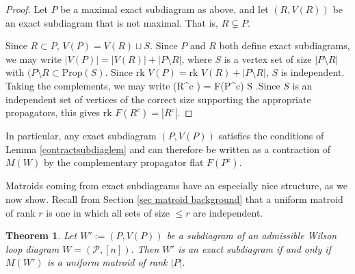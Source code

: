\documentclass[11pt]{article}
\newcommand{\rk}{\textrm{rk }}
\def\bas #1\eas{\begin{align*} #1 \end{align*}}
\newcommand{\cP}{\mathcal{P}}
\newcommand{\Prop}{\textrm{Prop}}
\newtheorem{thm}{Theorem}[section]
\theoremstyle{remark}
\theoremstyle{definition}
\begin{document}
\begin{proof}
Let $P$ be a maximal exact subdiagram as above, and let $(R,V(R))$ be an exact subdiagram that is not maximal. That is, $R \subsetneq P$.

Since $R \subset P$, $V(P) = V(R) \sqcup S$. Since $P$ and $R$ both define exact subdiagrams, we may write $|V(P)| = |V(R)| + |P \setminus R|$, where $S$ is a vertex set of size $|P \setminus R|$ with $(P \setminus R \subset \Prop(S)$. Since $\rk V(P) =  \rk V(R) + |P \setminus R|$, $S$ is independent. Taking the complements, we may write \bas F(R^c ) = F(P^c) \sqcup S \;.\eas Since $S$ is an independent set of vertices of the correct size supporting the appropriate propagators, this gives $ \rk F(R^c ) = |R^c|$.

\end{proof}


In particular, any exact subdiagram $(P,V(P))$ satisfies the conditions of Lemma \ref{contractsubdiaglem} and can therefore be written as a contraction of $M(W)$ by the complementary propagator flat $F(P^c)$. 

Matroids coming from exact subdiagrams have an especially nice structure, as we now show. Recall from Section \ref{sec matroid background} that a uniform matroid of rank $r$ is one in which all sets of size $ \leq r$ are independent.

\begin{thm} \label{exactcircuitlem}
Let $W':= (P, V(P))$ be a subdiagram of an admissible Wilson loop diagram $W= (\cP, [n])$. Then $W'$ is an exact subdiagram if and only if $M(W')$ is a uniform matroid of rank $|P|$.
\end{thm}
\end{document}
